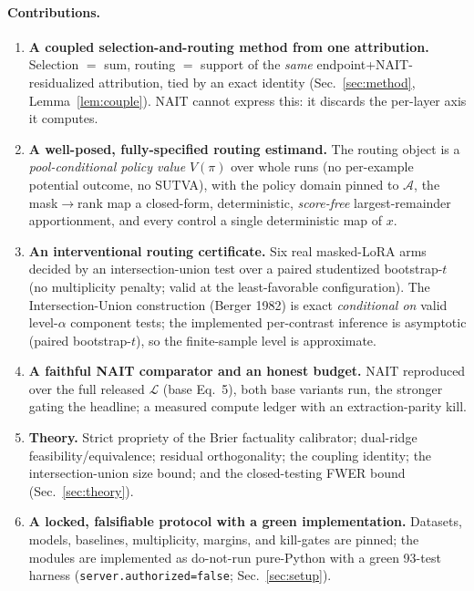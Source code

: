 \documentclass[11pt]{article}
\theoremstyle{definition}
\newcommand{\Aset}{\mathcal{A}}
\newcommand{\Lset}{\mathcal{L}}
\newcommand{\Vpol}{V}
\begin{document}
\paragraph{Contributions.}
\begin{enumerate}[leftmargin=1.5em,itemsep=2pt]
\item \textbf{A coupled selection-and-routing method from one attribution.} Selection
$=$ sum, routing $=$ support of the \emph{same} endpoint+NAIT-residualized attribution,
tied by an exact identity (Sec.~\ref{sec:method}, Lemma~\ref{lem:couple}). NAIT cannot
express this: it discards the per-layer axis it computes.
\item \textbf{A well-posed, fully-specified routing estimand.} The routing object is a
\emph{pool-conditional policy value} $\Vpol(\pi)$ over whole runs (no per-example
potential outcome, no SUTVA), with the policy domain pinned to $\Aset$, the mask$\to$rank
map a closed-form, deterministic, \emph{score-free} largest-remainder apportionment, and
every control a single deterministic map of $x$.
\item \textbf{An interventional routing certificate.} Six real masked-LoRA arms decided
by an intersection-union test over a paired studentized bootstrap-$t$ (no multiplicity
penalty; valid at the least-favorable configuration). The Intersection-Union construction
(Berger 1982) is exact \emph{conditional on} valid level-$\alpha$ component tests; the
implemented per-contrast inference is asymptotic (paired bootstrap-$t$), so the
finite-sample level is approximate.
\item \textbf{A faithful NAIT comparator and an honest budget.} NAIT reproduced over the
full released $\Lset$ (base Eq.~5), both base variants run, the stronger gating the
headline; a measured compute ledger with an extraction-parity kill.
\item \textbf{Theory.} Strict propriety of the Brier factuality calibrator; dual-ridge
feasibility/equivalence; residual orthogonality; the coupling identity; the
intersection-union size bound; and the closed-testing FWER bound (Sec.~\ref{sec:theory}).
\item \textbf{A locked, falsifiable protocol with a green implementation.} Datasets,
models, baselines, multiplicity, margins, and kill-gates are pinned; the modules are
implemented as do-not-run pure-Python with a green 93-test harness
(\texttt{server.authorized=false}; Sec.~\ref{sec:setup}).
\end{enumerate}
\end{document}
